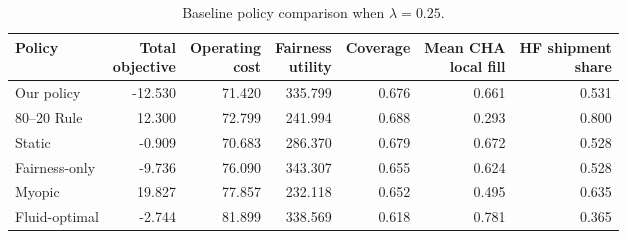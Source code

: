 \begin{table}[!ht]
    \centering \small
    \setlength{\tabcolsep}{4pt}
    \renewcommand{\arraystretch}{1.12}
    \caption{Baseline policy comparison when $\lambda=0.25$.}
    \label{tab:baseline_compact_comparison}
    \begin{tabular}{lrrrrrr}
    \toprule
    Policy & \makecell{Total\\objective} & \makecell{Operating\\cost} & \makecell{Fairness\\utility} & Coverage & \makecell{Mean CHA\\local fill} & \makecell{HF shipment\\share} \\
    \midrule
    Our policy & -12.530 & 71.420 & 335.799 & 0.676 & 0.661 & 0.531 \\
    80--20 Rule & 12.300 & 72.799 & 241.994 & 0.688 & 0.293 & 0.800 \\
    Static & -0.909 & 70.683 & 286.370 & 0.679 & 0.672 & 0.528 \\
    Fairness-only & -9.736 & 76.090 & 343.307 & 0.655 & 0.624 & 0.528 \\
    Myopic & 19.827 & 77.857 & 232.118 & 0.652 & 0.495 & 0.635 \\
    Fluid-optimal & -2.744 & 81.899 & 338.569 & 0.618 & 0.781 & 0.365 \\
    \bottomrule
    \end{tabular}
\end{table}
